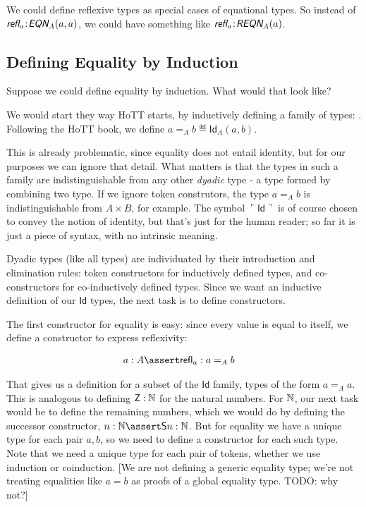 \documentclass{article}
\begin{document}
We could define reflexive types as special cases of equational types.
So instead of \( \tj{\refl_a}{\EQN_A(a,a)}\), we could have something like
\(\tj{\refl_a}{\REQN_A(a)}\).


\subsection{Defining Equality by Induction}

Suppose we could define equality by induction. What would that look
like?

We would start they way HoTT starts, by inductively defining a family
of types: . Following the HoTT book, we define
\(a=_Ab\eqdef\textsf{Id}_A(a,b)\).

This is already problematic, since equality does not entail identity,
but for our purposes we can ignore that detail. What matters is that
the types in such a family are indistinguishable from any other
\textit{dyadic} type - a type formed by combining two type. If we
ignore token construtors, the type \(a=_Ab\) is indistinguishable from
\(A\times B\), for example. The symbol
\(\ulcorner\textsf{Id}\urcorner\) is of course chosen to convey the
notion of identity, but that's just for the human reader; so far it is
just a piece of syntax, with no intrinsic meaning.

Dyadic types (like all types) are individuated by their introduction
and elimination rules: token constructors for inductively defined
types, and co-constructors for co-inductively defined types. Since we
want an inductive definition of our \(\textsf{Id}\) types, the next
task is to define constructors.

The first constructor for equality is easy: since every value is equal
to itself, we define a constructor to express reflexivity:

\begin{align}
  & a:A\linfer\textsf{refl}_a: a=_Ab
\end{align}

That gives us a definition for a subset of the \(\textsf{Id}\) family,
types of the form \(a=_A a\). This is analogous to defining
\(\textsf{Z}: \mathbb{N}\) for the natural numbers. For \(\mathbb{N}\), our next
task would be to define the remaining numbers, which we would do by
defining the successor constructor, \(n:\Nat\linfer \textsf{S}n:\Nat\).
But for equality we have a unique type for each pair \(a,b\), so we
need to define a constructor for each such type. Note that we need a unique
type for each pair of tokens, whether we use induction or coinduction.
[We are not defining a generic equality type; we're not treating
  equalities like \(a=b\) as proofs of a global equality type. TODO:
  why not?]
\end{document}
